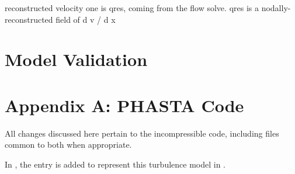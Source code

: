 \documentclass[11pt]{article}
\begin{document}
reconstructed velocity one is qres, coming from the flow solve. qres is a nodally-reconstructed field of d v / d x

\section{Model Validation} %

\section*{Appendix A: PHASTA Code} %

All changes discussed here pertain to the incompressible code, including files common to both when appropriate.

In , the entry  is added to represent this turbulence model in .




\end{document}
